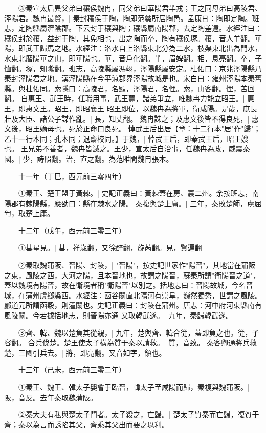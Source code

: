　　③秦宣太后異父弟曰穰侯魏冉，同父弟曰華陽君羋戎；王之同母弟曰高陵君、涇陽君。魏冉最賢，|{
	秦封穰侯于陶，陶即范蠡所居陶邑。孟康曰：陶即定陶。班志，定陶縣屬濟陰郡。下云封于穰與陶；穰縣屬南陽郡，去定陶差遠。水經注曰：穰侯封於穰，益封于陶，其免相也，出之陶而卒，陶有穰侯塚。穰，音人羊翻。華陽，即武王歸馬之地。水經注：洛水自上洛縣東北分為二水，枝渠東北出為門水，水東北曆陽華之山，即華陽也。華，音戶化翻。羋，眉婢翻。相，息亮翻。卒，子恤翻。塚，知隴翻。班志，高陵縣屬馮翊，涇陽縣屬安定。杜佑曰：京兆涇陽縣乃秦封涇陽君之地。漢涇陽縣在今平涼郡界涇陽故城是也。宋白曰：雍州涇陽本秦舊縣。與杜佑同。索隱曰：高陵君，名顯，涇陽君，名悝。索，山客翻。悝，苦回翻。
	}
自惠王、武王時，任職用事，武王薨，諸弟爭立，唯魏冉力能立昭王。|{
	惠王，即惠文王。昭王，即昭襄王
	}
昭王即位，以魏冉為將軍，衛咸陽。是歲，庶長壯及大臣、諸公子謀作亂。|{
	長，知丈翻。
	}
魏冉誅之；及惠文後皆不得良死，|{
	惠文後，昭王嫡母也。死於正命曰良死。
	}
悼武王后出居【章：十二行本"居"作"歸"；乙十一行本同；孔本同；退齋校同。】于魏，|{
	悼武王后，即秦武王后，昭王嫂也。
	}
王兄弟不善者，魏冉皆滅之。王少，宣太后自治事，任魏冉為政，威震秦國。|{
	少，詩照翻。治，直之翻。為范睢間魏冉張本。
	}

　　十一年（丁巳，西元前三零四年）

　　①秦王、楚王盟于黃棘。|{
	史記正義曰：黃棘蓋在房、襄二州。余按班志，南陽郡有棘陽縣，應劭曰：縣在棘水之陽。
	}
秦複與楚上庸。|{
	三年，秦敗楚師，虜屈匄，取楚上庸。
	}

　　十二年（戊午，西元前三零三年）

　　①彗星見。|{
	彗，祥歲翻，又徐醉翻，旋芮翻。見，賢遍翻
	}

　　②秦取魏蒲阪、晉陽、封陵，|{
	"晉陽"，按史記世家作"陽晉"，其地當在蒲阪之東，風陵之西，大河之陽，且本晉地也，故謂之陽晉，蘇秦所謂"衛陽晉之道"，蓋以魏境有陽晉，故在衛境者稱"衛陽晉"以別之。括地志曰：晉陽故城，今名晉城，在蒲州虞鄉縣西。水經注：函谷關直北隔河有崇阜，巍然獨秀，世謂之風陵。酈道元所謂函穀，則潼關也。史記正義曰：封陵在蒲州。唐志：河中府河東縣南有風陵關。今若據括地志，則晉陽亦通
	}
又取韓武遂。|{
	九年，秦歸韓武遂。
	}

　　③齊、韓、魏以楚負其從親，|{
	九年，楚與齊、韓合從，蓋即負之也。從，子容翻。
	}
合兵伐楚。楚王使太子橫為質于秦以請救。|{
	質，音致。
	}
秦客卿通將兵救楚，三國引兵去。|{
	將，即亮翻。又音如字，領也。
	}

　　十三年（己未，西元前三零二年）

　　①秦王、魏王、韓太子嬰會于臨晉，韓太子至咸陽而歸，秦複與魏蒲阪。|{
	阪，音反。去年秦取魏蒲阪。
	}

　　②秦大夫有私與楚太子鬥者。太子殺之，亡歸。|{
	楚太子質秦而亡歸，復質于齊；秦以為言而誘陷其父，齊乘其父出而要之以利。
	}

